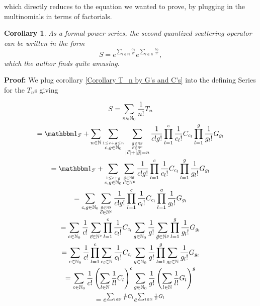 \documentclass[b5paper,draft,openbib,12pt]{memoir}
\newtheorem{Corollary}[Def]{Corollary}
\newcommand{\id}{{\mathbbm 1}}
\begin{document}
which directly reduces to the equation we wanted to prove, by plugging in the multinomials in terms of
factorials. 

\begin{Corollary}
As a formal power series, the second quantized scattering operator can be written in the form
\begin{equation}
S= e^{\sum_{l\in\mathbb{N}} \frac{C_{l}}{l!}}
 e^{\sum_{l\in\mathbb{N}} \frac{G_{l}}{l!}},
\end{equation}
which the author finds quite amusing.
\end{Corollary}
\textbf{Proof:} We plug corollary \ref{Corollary T_n by G's and C's} into the defining Series for the \(T_n\)s
giving

\begin{multline}
S= \sum_{n\in\mathbb{N}_0} \frac{1}{n!} T_n \\
=\id_{\mathcal{F}}+ \sum_{n\in\mathbb{N}} \sum_{\stackrel{1\le c+g\le n}{c,g\in\mathbb{N}_0}} 
\sum_{\stackrel{\stackrel{\vec{g}\in\mathbb{N}^g}{\vec{c}\in\mathbb{N}^c}}{|\vec{c}| + |\vec{g}|=n}} 
\frac{1}{c! g!} \prod_{l=1}^c \frac{1}{c_l!} C_{c_l} \prod_{l=1}^g \frac{1}{g_l!} G_{g_l}\\
=\id_{\mathcal{F}}+  \sum_{\stackrel{1\le c+g }{c,g\in\mathbb{N}_0}} 
\sum_{\stackrel{\vec{g}\in\mathbb{N}^g}{\vec{c}\in\mathbb{N}^c}} 
\frac{1}{c! g!} \prod_{l=1}^c \frac{1}{c_l!} C_{c_l} \prod_{l=1}^g \frac{1}{g_l!} G_{g_l}\\
=\sum_{c,g\in\mathbb{N}_0}
\sum_{\stackrel{\vec{g}\in\mathbb{N}^g}{\vec{c}\in\mathbb{N}^c}} 
\frac{1}{c! g!} \prod_{l=1}^c \frac{1}{c_l!} C_{c_l} \prod_{l=1}^g \frac{1}{g_l!} G_{g_l}\\
=\sum_{c\in\mathbb{N}_0} \frac{1}{c!} \sum_{\vec{c}\in\mathbb{N}^c} \prod_{l=1}^c \frac{1}{c_l!} C_{c_l}
\sum_{g\in\mathbb{N}_0} \frac{1}{g!} \sum_{\vec{g}\in\mathbb{N}^g} \prod_{l=1}^g \frac{1}{g_l!} G_{g_l}\\
=\sum_{c\in\mathbb{N}_0} \frac{1}{c!} \prod_{l=1}^c \sum_{c_l\in\mathbb{N}} \frac{1}{c_l!} C_{c_l}
\sum_{g\in\mathbb{N}_0} \frac{1}{g!}  \prod_{l=1}^g \sum_{g_l\in\mathbb{N}} \frac{1}{g_l!} G_{g_l}\\
=\sum_{c\in\mathbb{N}_0} \frac{1}{c!} \left( \sum_{l\in\mathbb{N}} \frac{1}{l!} C_{l}\right)^c
\sum_{g\in\mathbb{N}_0} \frac{1}{g!}  \left( \sum_{l\in\mathbb{N}} \frac{1}{l!} G_{l}\right)^g\\
=e^{\sum_{l\in\mathbb{N}} \frac{1}{l!} C_{l}} e^{\sum_{l\in\mathbb{N}} \frac{1}{l!} G_{l}}
\end{multline}
\end{document}
